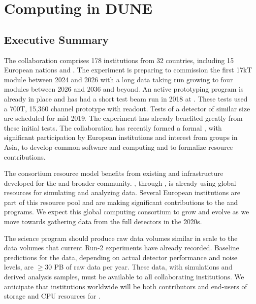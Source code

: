 \newcommand{\ldshort}[1]{{\bf{[#1]}}\todo{define abbr #1}}
\newcommand{\lcite}[1]{\cite{#1}}


\chapter{Computing in DUNE}
\label{ch:exec-comp}

\section{Executive Summary}
\label{ch:exec-comp-es}

The   collaboration comprises 178 institutions from 32 countries, including 15 European nations and . The experiment is preparing to commission the first 17kT    module between 2024 and 2026 with a long data taking run growing to four modules between 2026 and 2036 and beyond.  An active prototyping program is already in place and has had  a short test beam run in 2018 at .  These tests used  a 700T, 15,360 channel prototype  with  readout.  Tests of a  detector of similar size are scheduled for mid-2019.   The  experiment has already  benefited greatly from these initial tests.  The collaboration has recently formed a formal , with significant participation by European institutions and interest from groups in Asia, to develop common software and computing and to formalize resource contributions.

The consortium resource model benefits from existing   and  infrastructure developed for the  and broader  community.  , through  , is already using global resources for simulating and analyzing   data.  Several European institutions are part of this resource pool and are making significant contributions to the  and  programs.  We expect this global computing consortium to grow and evolve as we move towards gathering data from the full  detectors in the 2020s.

The  science program should produce raw data volumes similar in scale to the data volumes that current  Run-2 experiments have already recorded.  Baseline predictions for the  data, depending on actual detector performance and noise levels, are $\ge 30$ PB of raw data per year.  These data, with simulations and derived analysis samples, must be available to all collaborating institutions.  We anticipate that institutions worldwide will be both contributors and end-users of storage and CPU resources for .


